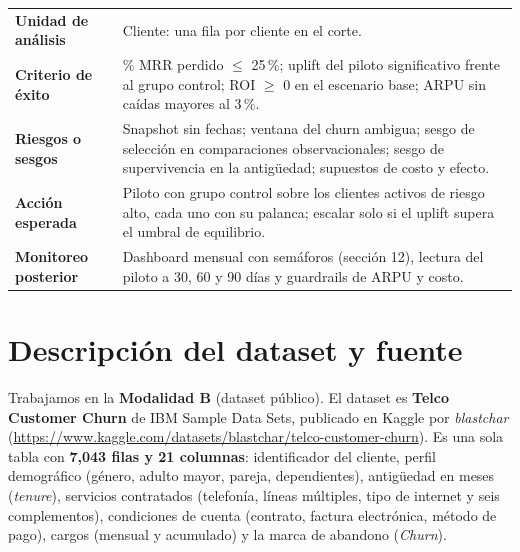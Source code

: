 \documentclass[10.5pt,a4paper]{article}
\begin{document}
\begin{table}[H]
\begin{tabularx}{\textwidth}{@{}>{\bfseries}P{3.1cm}X@{}}
Unidad de análisis & Cliente: una fila por cliente en el corte. \\
Criterio de éxito & \% MRR perdido $\leq$ 25\,\%; uplift del piloto significativo frente al grupo control; ROI $\geq$ 0 en el escenario base; ARPU sin caídas mayores al 3\,\%. \\
Riesgos o sesgos & Snapshot sin fechas; ventana del churn ambigua; sesgo de selección en comparaciones observacionales; sesgo de supervivencia en la antigüedad; supuestos de costo y efecto. \\
Acción esperada & Piloto con grupo control sobre los clientes activos de riesgo alto, cada uno con su palanca; escalar solo si el uplift supera el umbral de equilibrio. \\
Monitoreo posterior & Dashboard mensual con semáforos (sección 12), lectura del piloto a 30, 60 y 90 días y guardrails de ARPU y costo. \\
\bottomrule
\end{tabularx}
\end{table}

\section{Descripción del dataset y fuente}
Trabajamos en la \textbf{Modalidad B} (dataset público). El dataset es \textbf{Telco Customer Churn} de IBM Sample Data Sets, publicado en Kaggle por \emph{blastchar} (\url{https://www.kaggle.com/datasets/blastchar/telco-customer-churn}). Es una sola tabla con \textbf{7,043 filas y 21 columnas}: identificador del cliente, perfil demográfico (género, adulto mayor, pareja, dependientes), antigüedad en meses (\emph{tenure}), servicios contratados (telefonía, líneas múltiples, tipo de internet y seis complementos), condiciones de cuenta (contrato, factura electrónica, método de pago), cargos (mensual y acumulado) y la marca de abandono (\emph{Churn}).
\end{document}
